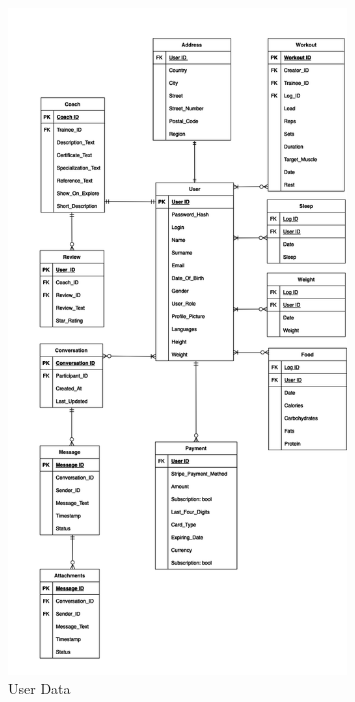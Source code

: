  \begin{figure}[H]
    \centering
    \includegraphics[width=0.8\textwidth]{images/uml2.png}
    \caption{ User Data }
    \label{fig:uml2}
  \end{figure}


